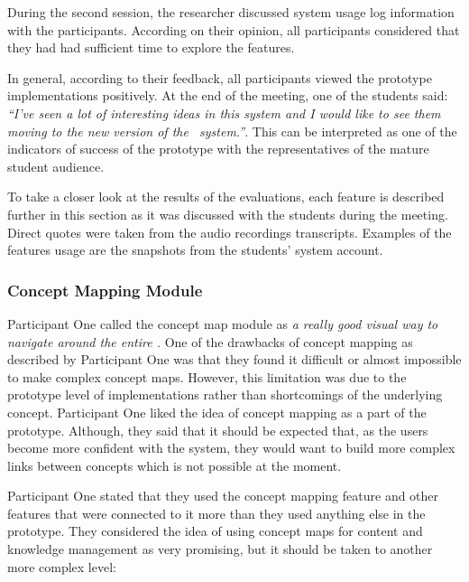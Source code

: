 During the second session, the researcher discussed system usage log information
with the participants. According on their opinion, all participants considered
that they had had sufficient time to explore the features. 

In general, according to their feedback, all participants viewed the prototype
implementations positively. At the end of the meeting, one of the students said:
\textit{``I've seen a lot of interesting ideas in this system and I would like
to see them moving to the new version of the \ep~system.''}. This can be
interpreted as one of the indicators of success of the prototype with the
representatives of the mature student audience.

To take a closer look at the results of the evaluations, each feature is
described further in this section as it was discussed with the students during
the meeting. Direct quotes were taken from the audio recordings transcripts.
Examples of the features usage are the snapshots from the students' system
account.

\subsubsection{Concept Mapping Module}

Participant One called the concept map module as \textit{a really good visual
way to navigate around the entire \ep.} One of the drawbacks of concept mapping
as described by Participant One was that they found it difficult or almost
impossible to make complex concept maps. However, this limitation was due to the
prototype level of implementations rather than shortcomings of the underlying
concept. Participant One liked the idea of concept mapping as a part of the
prototype. Although, they said that it should be expected that, as the users
become more confident with the system, they would want to build more complex
links between concepts which is not possible at the moment.

Participant One stated that they used the concept mapping feature and other
features that were connected to it more than they used anything else in the
prototype. They considered the idea of using concept maps for content and
knowledge management as very promising, but it should be taken to another more
complex level:


